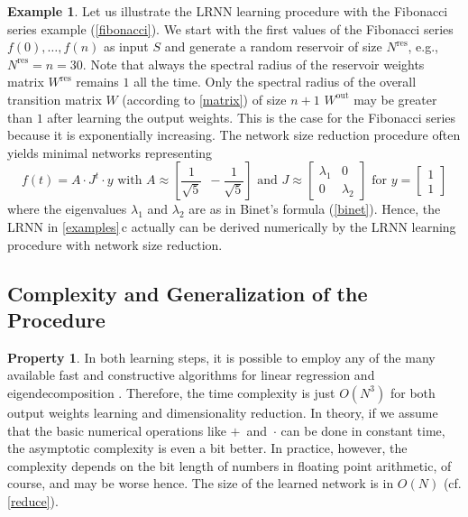 \documentclass[twoside,11pt]{article}
\theoremstyle{definition}
\newtheorem{exmp}{Example}
\newtheorem{prop}{Property}
\begin{document}
\begin{exmp}\label{continued}
Let us illustrate the LRNN learning procedure with the Fibonacci series example
(\cref{fibonacci}). We start with the first values of the Fibonacci series
$f(0),\dots,f(n)$ as input $S$ and generate a random reservoir of size
$N^\mathrm{res}$, e.g., $N^\mathrm{res}=n=30$. Note that always the spectral
radius of the reservoir weights matrix $W^\mathrm{res}$ remains $1$ all the
time. Only the spectral radius of the overall transition matrix $W$ (according
to \cref{matrix}) of size $n+1$ $W^\mathrm{out}$ may be greater than $1$ after
learning the output weights. This is the case for the Fibonacci series because
it is exponentially increasing. The network size reduction procedure often
yields minimal networks representing
\[
    f(t) = A \cdot J^t \cdot y \text{~with~}
	A \approx \left[ \frac{1}{\sqrt{5}} ~~ -\!\frac{1}{\sqrt{5}} \right] \text{~and~}
	J \approx \left[ \begin{array}{cc}
		\lambda_1 & 0\\
		0 & \lambda_2
   	\end{array} \right] \text{~for~}
	y = \left[ \begin{array}{c}
	1\\
	1
   \end{array} \right]
\]
where the eigenvalues $\lambda_1$ and $\lambda_2$ are as in Binet's formula
(\cref{binet}). Hence, the LRNN in \cref{examples}\,c actually can be derived
numerically by the LRNN learning procedure with network size reduction.
\end{exmp}

\subsection{Complexity and Generalization of the Procedure}

\begin{prop}\label{complexity}
In both learning steps, it is possible to employ any of the many available fast
and constructive algorithms for linear regression and eigendecomposition
\citep{DDH07}. Therefore, the time complexity is just $O(N^3)$ for both output
weights learning and dimensionality reduction. In theory, if we assume that
the basic numerical operations like $+$~and~$\cdot$ can be done in constant
time, the asymptotic complexity is even a bit better. In practice, however, the
complexity depends on the bit length of numbers in floating point arithmetic,
of course, and may be worse hence. The size of the learned network is in $O(N)$
(cf. \cref{reduce}).
\end{prop}
\end{document}
